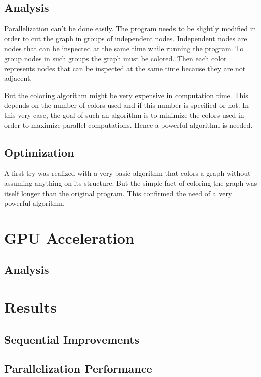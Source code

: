 \documentclass[fleqn,11pt]{SelfArx} %
\begin{document}
\subsection{Analysis}

Parallelization can't be done easily. The program needs to be slightly modified in order to cut the graph in groups of independent nodes. Independent nodes are nodes that can be inspected at the same time while running the program. To group nodes in such groups the graph must be colored. Then each color represents nodes that can be inspected at the same time because they are not adjacent.

But the coloring algorithm might be very expensive in computation time. This depends on the number of colors used and if this number is specified or not. In this very case, the goal of such an algorithm is to minimize the colors used in order to maximize parallel computations. Hence a powerful algorithm is needed.

\subsection{Optimization}

A first try was realized with a very basic algorithm that colors a graph without assuming anything on its structure. But the simple fact of coloring the graph was itself longer than the original program. This confirmed the need of a very powerful algorithm.


\section{GPU Acceleration}

\subsection{Analysis}


\section{Results}

\subsection{Sequential Improvements}

\subsection{Parallelization Performance}
\end{document}
